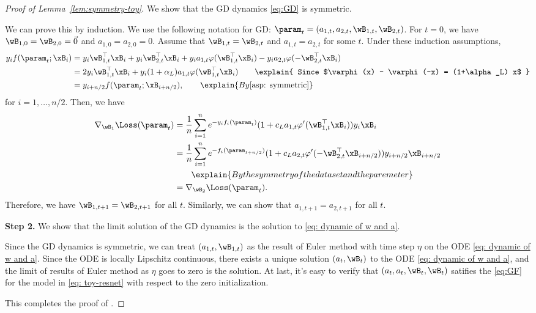 \begin{proof}[Proof of Lemma~\ref{lem:symmetry-toy}]

 We show that the GD dynamics \eqref{eq:GD} is symmetric.  

\noindent We can prove this by induction. We use the following notation for GD: $\param_t = (a_{1,t}, a_{2,t},\wB_{1,t}, \wB_{2,t})$. For $t=0$, we have $\wB_{1,0} = \wB_{2,0} = \vec 0$ and $a_{1,0} = a_{2,0} = 0$. Assume that $\wB_{1,t} = \wB_{2,t}$ and $a_{1,t} = a_{2,t}$ for some $t$. Under these induction assumptions, 
\begin{align*}
    y_i f(\param_t;\xB_i) &= y_i \wB_{1,t}^\top \xB_i + y_i \wB_{2,t}^\top \xB_i + y_i a_{1,t} \varphi(\wB_{1,t}^\top \xB_i) - y_i a_{2,t} \varphi(-\wB_{2,t}^\top \xB_i) \\ 
    &= 2y_i \wB_{1,t}^\top \xB_i + y_i (1+ \alpha_L)a_{1,t} \varphi(\wB_{1,t}^\top \xB_i)  \qquad \explain{ Since $\varphi(x) - \varphi(-x) = (1+\alpha _L) x$ } \\ 
    & = y_{i+n/2} f(\param_t;\xB_{i+n/2}), \qquad \explain{ By \cref{asp: symmetric} } 
\end{align*}
for $i=1,\ldots ,n/2$. Then, we have 
\begin{align*}
    \nabla_{\wB_1} \Loss (\param_t) &= \frac{1}{n} \sum_{i=1}^n e^{-y_if_i(\param_t)} (1+ c_L a_{1,t} \varphi'(\wB_{1,t}^\top \xB_i))y_i \xB_i \\ 
    &= \frac{1}{n} \sum_{i=1}^n e^{-f_i(\param_{t+n /2})} (1+ c_L a_{2,t} \varphi'(-\wB_{2,t}^\top \xB_{i+n/2}))y_{i+n/2} \xB_{i+n/2} \\ 
    & \qquad \explain{ By the symmetry of the dataset and the paremeter }  \\
    & = \nabla_{\wB_2} \Loss (\param_t). 
\end{align*}
Therefore, we have $\wB_{1,t+1} = \wB_{2,t+1}$ for all $t$. Similarly, we can show that $a_{1,t+1} = a_{2,t+1}$ for all $t$. 


\textbf{Step 2.} We show that the limit solution of the GD dynamics is the solution to \eqref{eq: dynamic of w and a}. 

\noindent Since the GD dynamics is symmetric, we can treat $(a_{1,t}, \wB_{1,t})$  as the result of Euler method with time step $\eta$ on the ODE \eqref{eq: dynamic of w and a}. Since the ODE is locally Lipschitz continuous, there exists a unique solution $(a_t,\wB_t)$ to the ODE \eqref{eq: dynamic of w and a}, and the limit of results of Euler method as $\eta$ goes to zero is the solution. At last, it's easy to verify that $(a_t,a_t, \wB_t, \wB_t)$ satifies the \eqref{eq:GF} for the model in \eqref{eq: toy-resnet} with respect to the zero initialization.

This completes the proof of .
\end{proof}
